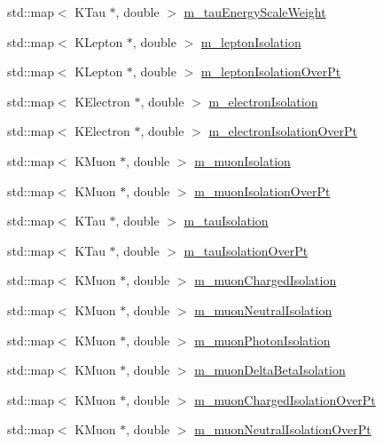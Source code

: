 \begin{DoxyCompactItemize}
\item 
std::map$<$ KTau $\ast$, double $>$ \hyperlink{classHttProduct_ae3eb0ecf3e4e1bfeb79cb090e6224582}{m\_\-tauEnergyScaleWeight}
\item 
std::map$<$ KLepton $\ast$, double $>$ \hyperlink{classHttProduct_adecfb7ee858684689f8d4aad6faa0be9}{m\_\-leptonIsolation}
\item 
std::map$<$ KLepton $\ast$, double $>$ \hyperlink{classHttProduct_a6b289be98575ef2ae3f0d8c9ae7b432f}{m\_\-leptonIsolationOverPt}
\item 
std::map$<$ KElectron $\ast$, double $>$ \hyperlink{classHttProduct_a29ffba30f2e0e486ebe1f6267461d0a8}{m\_\-electronIsolation}
\item 
std::map$<$ KElectron $\ast$, double $>$ \hyperlink{classHttProduct_a8f5dd10373ad2d502aea2f9ad4446cee}{m\_\-electronIsolationOverPt}
\item 
std::map$<$ KMuon $\ast$, double $>$ \hyperlink{classHttProduct_a56c9bfb7b1ef1191b730bb36a9fc9972}{m\_\-muonIsolation}
\item 
std::map$<$ KMuon $\ast$, double $>$ \hyperlink{classHttProduct_aa378e6264b7559aa9e86a5aa691f60a7}{m\_\-muonIsolationOverPt}
\item 
std::map$<$ KTau $\ast$, double $>$ \hyperlink{classHttProduct_a367ae5e6dcf667daf5a392d6f6161222}{m\_\-tauIsolation}
\item 
std::map$<$ KTau $\ast$, double $>$ \hyperlink{classHttProduct_a58eff332aabde35e468ae2ef115696b2}{m\_\-tauIsolationOverPt}
\item 
std::map$<$ KMuon $\ast$, double $>$ \hyperlink{classHttProduct_a39b3d69fe737078f76c46dae49670add}{m\_\-muonChargedIsolation}
\item 
std::map$<$ KMuon $\ast$, double $>$ \hyperlink{classHttProduct_abdfa11aaba1b4edcba7715e68cf2aaca}{m\_\-muonNeutralIsolation}
\item 
std::map$<$ KMuon $\ast$, double $>$ \hyperlink{classHttProduct_a5aa31ac41552608c176cb28a3e3c06f6}{m\_\-muonPhotonIsolation}
\item 
std::map$<$ KMuon $\ast$, double $>$ \hyperlink{classHttProduct_a25a663d9b0c0c232d8b25834fd82a922}{m\_\-muonDeltaBetaIsolation}
\item 
std::map$<$ KMuon $\ast$, double $>$ \hyperlink{classHttProduct_a12dbd2d89ff730740180bcdf6e375089}{m\_\-muonChargedIsolationOverPt}
\item 
std::map$<$ KMuon $\ast$, double $>$ \hyperlink{classHttProduct_ab1f969d8d977e78fe88e12ef315f6583}{m\_\-muonNeutralIsolationOverPt}
\item 

\end{DoxyCompactItemize}
